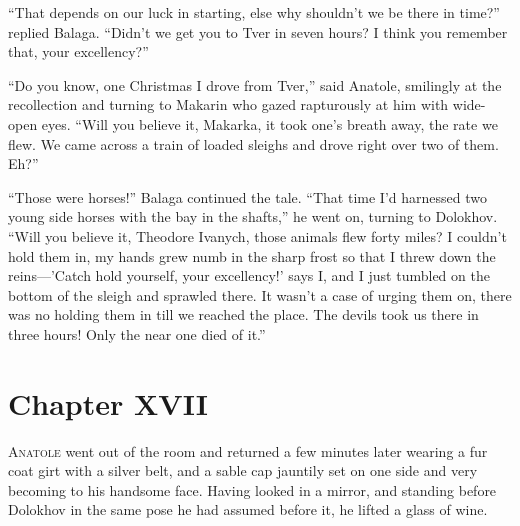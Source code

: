 ``That depends on our luck in starting, else why shouldn't we be
there in time?'' replied Balaga. ``Didn't we get you to Tver in
seven hours? I think you remember that, your excellency?''

``Do you know, one Christmas I drove from Tver,'' said Anatole,
smilingly at the recollection and turning to Makarin who gazed
rapturously at him with wide-open eyes. ``Will you believe it,
Makarka, it took one's breath away, the rate we flew. We came
across a train of loaded sleighs and drove right over two of
them. Eh?''

``Those were horses!'' Balaga continued the tale. ``That time I'd
harnessed two young side horses with the bay in the shafts,'' he
went on, turning to Dolokhov. ``Will you believe it, Theodore
Ivanych, those animals flew forty miles? I couldn't hold them in,
my hands grew numb in the sharp frost so that I threw down the
reins---'Catch hold yourself, your excellency!' says I, and I
just tumbled on the bottom of the sleigh and sprawled there. It
wasn't a case of urging them on, there was no holding them in
till we reached the place. The devils took us there in three
hours! Only the near one died of it.''


\chapter*{Chapter XVII}
\ifaudio     
{} 
\fi

\lettrine[lines=2, loversize=0.3, lraise=0]{\initfamily A}{natole}
went out of the room and returned a few minutes later
wearing a fur coat girt with a silver belt, and a sable cap
jauntily set on one side and very becoming to his handsome
face. Having looked in a mirror, and standing before Dolokhov in
the same pose he had assumed before it, he lifted a glass of
wine.

